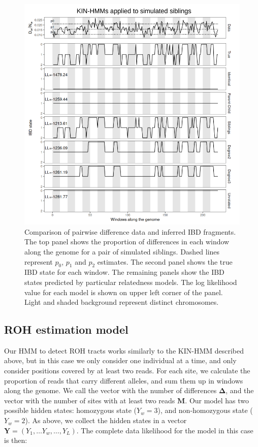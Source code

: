 \documentclass[12pt, letterpaper]{article}
\begin{document}
\begin{figure}[h!]
    \includegraphics[width=16cm]{plots/inkscape_finalImg/IBDplot_title.png}
    \centering
    \caption{Comparison of pairwise difference data and inferred IBD fragments. The top panel shows the proportion of differences in each window along the genome for a pair of simulated siblings. Dashed lines represent $p_0$, $p_1$ and $p_2$ estimates. The second panel shows the true IBD state for each window. The remaining panels show the IBD states predicted by particular relatedness models. The log likelihood value for each model is shown on upper left corner of the panel. Light and shaded background represent distinct chromosomes.}
    \label{fig1:ibd}
\end{figure}

\subsection{ROH estimation model}\label{roh}
Our HMM to detect ROH tracts works similarly to the KIN-HMM described above, but in this case we only consider one individual at a time, and only consider positions covered by at least two reads. For each site, we calculate the proportion of reads that carry different alleles, and sum them up in windows along the genome. We call the vector with the number of differences $\mathbf{\Delta}$, and the vector with the number of sites with at least two reads $\mathbf{M}$. Our model has two possible hidden states: homozygous state ($Y_w=3$), and non-homozygous state ($Y_w=2$). As above, we collect the hidden states in a vector $\mathbf{Y} = (Y_1, \dots Y_w, \dots, Y_L)$. The complete data likelihood for the model in this case is then:
\end{document}
